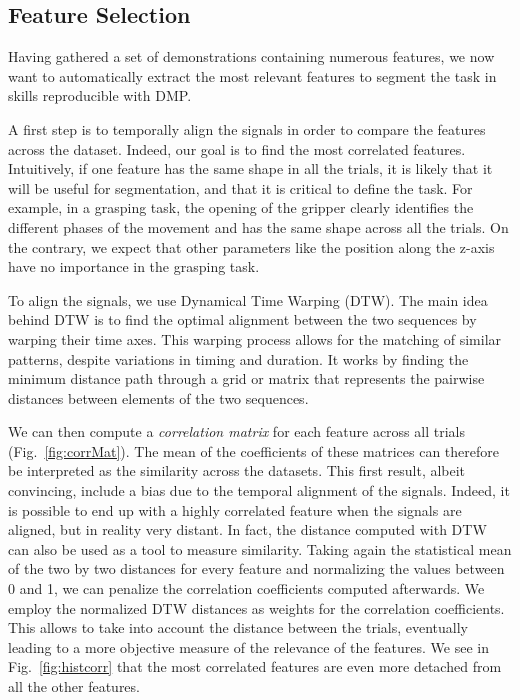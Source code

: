 \documentclass[conference]{IEEEtran}
\begin{document}
\subsection{Feature Selection} \label{feature_selection}

Having gathered a set of demonstrations containing numerous features, we now want to automatically extract the most relevant features to segment the task in skills reproducible with DMP.

A first step is to temporally align the signals in order to compare the features across the dataset. Indeed, our goal is to find the most correlated features. Intuitively, if one feature has the same shape in all the trials, it is likely that it will be useful for segmentation, and that it is critical to define the task. For example, in a grasping task, the opening of the gripper clearly identifies the different phases of the movement and has the same shape across all the trials. On the contrary, we expect that other parameters like the position along the z-axis have no importance in the grasping task.

To align the signals, we use Dynamical Time Warping (DTW). The main idea behind DTW is to find the optimal alignment between the two sequences by warping their time axes. This warping process allows for the matching of similar patterns, despite variations in timing and duration. It works by finding the minimum distance path through a grid or matrix that represents the pairwise distances between elements of the two sequences. \newline


We can then compute a \textit{correlation matrix} for each feature across all trials (Fig.~\ref{fig:corrMat}). The mean of the coefficients of these matrices can therefore be interpreted as the similarity across the datasets. This first result, albeit convincing, include a bias due to the temporal alignment of the signals. Indeed, it is possible to end up with a highly correlated feature when the signals are aligned, but in reality very distant. In fact, the distance computed with DTW can also be used as a tool to measure similarity. Taking again the statistical mean of the two by two distances for every feature and normalizing the values between 0 and 1, we can penalize the correlation coefficients computed afterwards. We employ the normalized DTW distances as weights for the correlation coefficients. This allows to take into account the distance between the trials, eventually leading to a more objective measure of the relevance of the features. We see in Fig.~\ref{fig:histcorr} that the most correlated features are even more detached from all the other features.  
\end{document}
